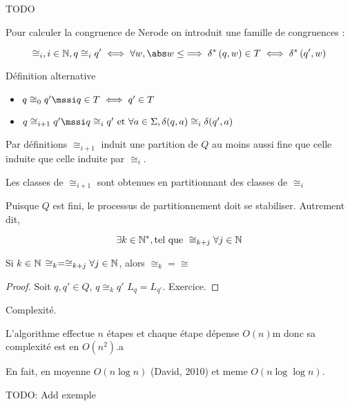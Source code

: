 TODO



Pour calculer la congruence de Nerode on introduit une famille de congruences :

$$ \cong_i, i  \in \N, q \cong_i q' \iff \forall w, \abs w \leq \implies \deltaS q w \in T \iff  \deltaS {q'} w$$


\begin{definition}
	Définition alternative

	\begin{itemize}
		\item $q \cong_0 q' \mssi q\in T \iff q' \in T$
		\item $q \cong_{i+1} q' \mssi q \cong_{i} q' \text{ et }  \forall a \in \Sigma, \delta (q,a) \cong_i \delta (q', a)$
	\end{itemize}
\end{definition}

\begin{remarque}
	Par définitions
	$\cong_{i+1}$ induit une partition de $Q$ au moins aussi fine que celle induite que celle induite par $\cong_i$.

	Les classes de $\cong_{i+1}$ sont obtenues en partitionnant des classes de $\cong_i$
\end{remarque}

\begin{remarque}
	Puisque $Q$ est fini, le processus de partitionnement doit se stabiliser. Autrement dit,

	$$\exists k \in \mathbb{N}^*, \text{tel que } \cong_{k+j} \forall j \in \mathbb{N}$$
\end{remarque}


\begin{prop}
	Si $k \in \mathbb{N}$ \tq $ \cong_k = \cong_{k+j} \forall j \in \mathbb{N}$, alors $\cong_k = \cong$
\end{prop}

\begin{proof}
	Soit $q,q' \in Q$, $q \cong_k q'$ \mq $L_q = L_{q'}$. Exercice.
\end{proof}

Complexité.

L'algorithme effectue $n$ étapes  et  chaque étape dépense $O(n)$m donc sa complexité est en $O(n^2)$.a

En fait, en moyenne $O(n \log n)$ (David, 2010) et meme $O(n \log \log n)$.

TODO: Add exemple
